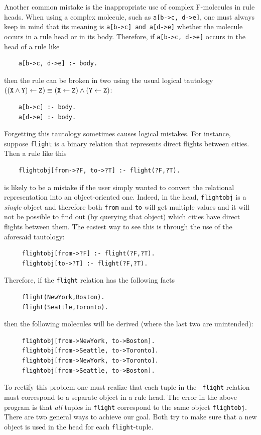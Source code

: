 \documentclass[11pt]{article}
\begin{document}
Another common mistake is the inappropriate use of complex F-molecules in
rule heads. When using a complex molecule, such as {\tt a[b->c, d->e]},
one must always keep in mind that  its meaning is {\tt a[b->c] and a[d->e]}
whether the molecule occurs in a rule head or in its body. Therefore, if
{\tt a[b->c, d->e]} occurs in the head of a rule like
\begin{verbatim}
    a[b->c, d->e] :- body.  
\end{verbatim}
then the rule can be broken in two using the usual logical tautology 
$\tt ((X\wedge Y)\leftarrow Z) \equiv (X\leftarrow Z)\wedge(Y\leftarrow Z)$:
\begin{verbatim}
    a[b->c] :- body.
    a[d->e] :- body.
\end{verbatim}
Forgetting this tautology sometimes causes logical mistakes.
For instance, suppose {\tt flight} is a binary relation that represents
direct flights between cities. Then a rule like this
\begin{verbatim}
    flightobj[from->?F, to->?T] :- flight(?F,?T).  
\end{verbatim}
is likely to be a mistake if the user simply wanted to convert the
relational representation into an object-oriented one. Indeed, in the head,
{\tt flightobj} is a \emph{single} object and therefore both {\tt from} and
{\tt to} will get multiple values and it will not be possible to find out
(by querying that object) which cities have direct flights between them.
The easiest way to see this is through the use of the aforesaid tautology:
\begin{verbatim}
     flightobj[from->?F] :- flight(?F,?T).
     flightobj[to->?T] :- flight(?F,?T).
\end{verbatim}
Therefore, if the {\tt flight} relation has the following facts
\begin{verbatim}
     flight(NewYork,Boston).  
     flight(Seattle,Toronto).  
\end{verbatim}
then the following molecules will be derived (where the last two are
unintended):
\begin{verbatim}
     flightobj[from->NewYork, to->Boston].  
     flightobj[from->Seattle, to->Toronto].  
     flightobj[from->NewYork, to->Toronto].  
     flightobj[from->Seattle, to->Boston].  
\end{verbatim}
To rectify this problem one must realize that each tuple in the {\tt
  flight} relation must correspond to a separate object in a rule head.
The error in the above program is that \emph{all} tuples in {\tt flight}
correspond to the same object {\tt flightobj}.  There are two general ways
to achieve our goal. Both try to make sure that a new object is used in
the head for each {\tt flight}-tuple.
\end{document}
